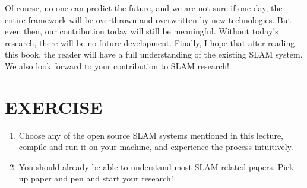 Of course, no one can predict the future, and we are not sure if one day, the entire framework will be overthrown and overwritten by new technologies. But even then, our contribution today will still be meaningful. Without today's research, there will be no future development. Finally, I hope that after reading this book, the reader will have a full understanding of the existing SLAM system. We also look forward to your contribution to SLAM research!

\section *{EXERCISE}
\begin{enumerate}
\item Choose any of the open source SLAM systems mentioned in this lecture, compile and run it on your machine, and experience the process intuitively.
\item You should already be able to understand most SLAM related papers. Pick up paper and pen and start your research!
\end{enumerate}